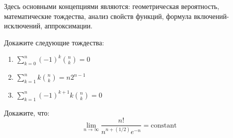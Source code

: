 \documentclass[document]{subfiles}
\begin{document}
Здесь основными концепциями являются: геометрическая вероятность, математические тождества, анализ свойств функций, формула включений-исключений, аппроксимации.

\begin{problem}
    Докажите следующие тождества:
    \begin{enumerate}
        \item $\sum_{k=0}^n (-1)^k \binom{n}{k} = 0$
        \item $\sum_{k=1}^n k \binom{n}{k} = n 2^{n-1}$
        \item $\sum_{k=1}^n (-1)^{k+1} k \binom{n}{k} = 0$ 
    \end{enumerate}
\end{problem}
\begin{solution}
    
\end{solution}

\begin{problem}
    Докажите, что:
    \[\lim_{n \to \infty}\frac{n!}{n^{n + (1/2)}e^{-n}} = \text{constant}\]
\end{problem}
\begin{solution}
    
\end{solution}
\end{document}
